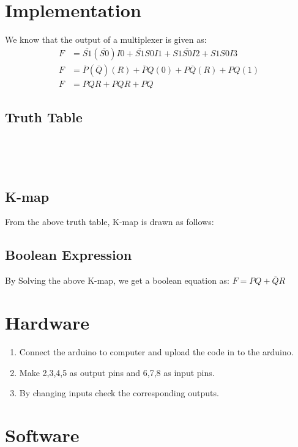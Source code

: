\documentclass[journal,twocolumn,10pt, a4paper]{article}
\begin{document}
\section{Implementation}
We know that the output of a multiplexer is given as:
\begin{align*}
F&=\overline{S1}(\overline{S0})I0+\overline{S1}S0I1+S1\overline{S0}I2+S1S0I3\\ 
F&=\overline{P}(\overline{Q})(R)+\overline{P}Q(0)+P\overline{Q}(R)+PQ(1)\\
F&={P}{Q}R+P{Q}R+PQ
\end{align*}


\subsection{Truth Table}\\

\begin{table}[!h]
\centering

\caption{}
\label{Table2:Truth Table}
\end{table}\\

\subsection{K-map}
From the above truth table, K-map is drawn as follows:
\begin{figure}[!h]

\caption{}
\label{fig:Fig 2}
\end{figure}
\subsection{Boolean Expression}
By Solving the above K-map, we get a boolean equation as: $F=PQ+\overline{Q}R$

\section{Hardware}
\begin{enumerate}
\item Connect the arduino to computer and upload the code in to the arduino.
\item Make 2,3,4,5 as output pins and 6,7,8 as input pins.
\item By changing inputs check the corresponding outputs.
\end{enumerate}

\section{Software}

\end{document}
